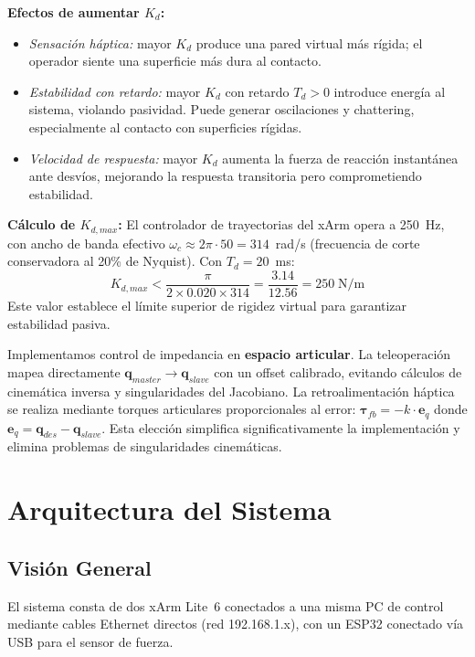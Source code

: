 \documentclass[journal,10pt,twoside]{IEEEtran}
\begin{document}
\textbf{Efectos de aumentar $K_d$:}
\begin{itemize}
  \item \textit{Sensación háptica:} mayor $K_d$ produce una pared virtual
        más rígida; el operador siente una superficie más dura al contacto.
  \item \textit{Estabilidad con retardo:} mayor $K_d$ con retardo $T_d>0$
        introduce energía al sistema, violando pasividad. Puede generar
        oscilaciones y chattering, especialmente al contacto con superficies
        rígidas.
  \item \textit{Velocidad de respuesta:} mayor $K_d$ aumenta la fuerza
        de reacción instantánea ante desvíos, mejorando la respuesta
        transitoria pero comprometiendo estabilidad.
\end{itemize}

\textbf{Cálculo de $K_{d,max}$:}
El controlador de trayectorias del xArm opera a 250~Hz, con ancho de
banda efectivo $\omega_c \approx 2\pi \cdot 50 = 314$~rad/s (frecuencia
de corte conservadora al 20\% de Nyquist). Con $T_d=20$~ms:
\[
  K_{d,max} < \frac{\pi}{2 \times 0{.}020 \times 314} = \frac{3{.}14}{12{.}56} = 250\;\text{N/m}
\]
Este valor establece el límite superior de rigidez virtual para
garantizar estabilidad pasiva.

Implementamos control de impedancia en \textbf{espacio articular}.
La teleoperación mapea directamente $\bm{q}_{master}\to\bm{q}_{slave}$
con un offset calibrado, evitando cálculos de cinemática inversa y
singularidades del Jacobiano. La retroalimentación háptica se realiza
mediante torques articulares proporcionales al error:
$\bm{\tau}_{fb}=-k\cdot\bm{e}_q$ donde $\bm{e}_q=\bm{q}_{des}-\bm{q}_{slave}$.
Esta elección simplifica significativamente la implementación y elimina
problemas de singularidades cinemáticas.

\section{Arquitectura del Sistema}
\label{sec:architecture}

\subsection{Visión General}

El sistema consta de dos xArm Lite~6 conectados a una misma PC
de control mediante cables Ethernet directos (red 192.168.1.x),
con un ESP32 conectado vía USB para el sensor de fuerza.
\end{document}
